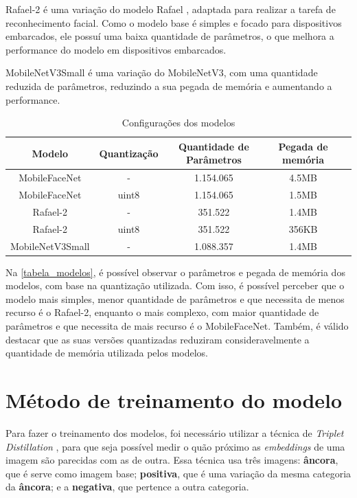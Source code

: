 Rafael-2 é uma variação do modelo Rafael \cite{rafael}, adaptada para realizar a tarefa de reconhecimento facial.
Como o modelo base é simples e focado para dispositivos embarcados, ele possuí uma baixa quantidade de parâmetros,
 o que melhora a performance do modelo em dispositivos embarcados.

MobileNetV3Small é uma variação do MobileNetV3, com uma quantidade reduzida de parâmetros, reduzindo a sua pegada de
memória e aumentando a performance.

\begin{table}[htb]
\centering
\ABNTEXfontereduzida
\caption[Configurações dos modelos]{Configurações dos modelos}
\label{tabela_modelos}
\begin{tabular}{ |c|c|c|c|c| }
	\hline
	\textbf{Modelo} 	& \textbf{Quantização} & \textbf{Quantidade de Parâmetros} & \textbf{Pegada de memória} \\
	\hline
	MobileFaceNet 		& - 	& 1.154.065 & 4.5MB \\
	MobileFaceNet 		& uint8 & 1.154.065 & 1.5MB \\
	Rafael-2 		& - 	& 351.522  & 1.4MB \\
	Rafael-2 		& uint8 & 351.522   & 356KB \\
	MobileNetV3Small 	& - 	& 1.088.357 & 1.4MB \\
	\hline
\end{tabular}
\end{table}

Na \autoref{tabela_modelos}, é possível observar o parâmetros e pegada de memória dos modelos, com base na quantização
utilizada.
Com isso, é possível perceber que o modelo mais simples, menor quantidade de parâmetros e que necessita de menos recurso
é o Rafael-2, enquanto o mais complexo, com maior quantidade de parâmetros e que necessita de mais recurso é o
MobileFaceNet. Também, é válido destacar que as suas versões quantizadas reduziram consideravelmente a quantidade de
memória utilizada pelos modelos.

\section{Método de treinamento do modelo}\label{sec_treinamento_modelo}
Para fazer o treinamento dos modelos, foi necessário utilizar a técnica de \textit{Triplet Distillation}
\cite{triplet_distillation_face_recognition},
para que seja possível medir o quão próximo as \textit{embeddings} de uma imagem são parecidas com as de outra.
Essa técnica usa três imagens: \textbf{âncora}, que é serve como imagem base; \textbf{positiva},
que é uma variação da mesma categoria da \textbf{âncora}; e a \textbf{negativa}, que pertence a outra categoria.

